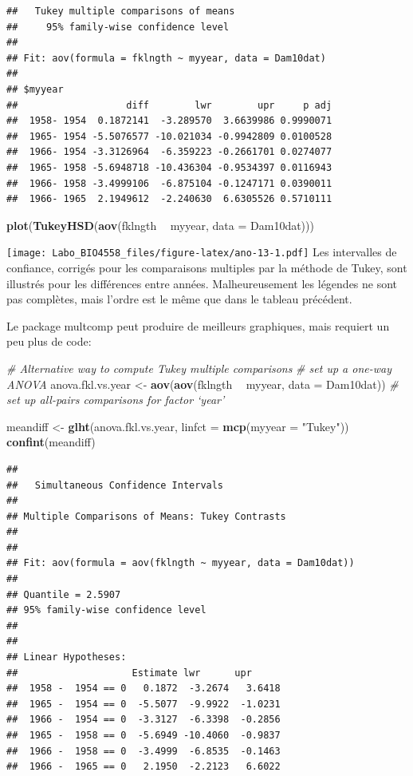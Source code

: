 \documentclass[12pt,]{book}
\newenvironment{Shaded}{\begin{snugshade}}{\end{snugshade}}
\newcommand{\CommentTok}[1]{\textcolor[rgb]{0.37,0.37,0.37}{\textit{#1}}}
\newcommand{\DataTypeTok}[1]{\textcolor[rgb]{0.27,0.27,0.27}{#1}}
\newcommand{\KeywordTok}[1]{\textcolor[rgb]{0.27,0.27,0.27}{\textbf{#1}}}
\newcommand{\NormalTok}[1]{#1}
\newcommand{\OperatorTok}[1]{\textcolor[rgb]{0.43,0.43,0.43}{\textbf{#1}}}
\newcommand{\StringTok}[1]{\textcolor[rgb]{0.5,0.5,0.5}{#1}}
\begin{document}
\begin{verbatim}
##   Tukey multiple comparisons of means
##     95% family-wise confidence level
## 
## Fit: aov(formula = fklngth ~ myyear, data = Dam10dat)
## 
## $myyear
##                   diff        lwr        upr     p adj
##  1958- 1954  0.1872141  -3.289570  3.6639986 0.9990071
##  1965- 1954 -5.5076577 -10.021034 -0.9942809 0.0100528
##  1966- 1954 -3.3126964  -6.359223 -0.2661701 0.0274077
##  1965- 1958 -5.6948718 -10.436304 -0.9534397 0.0116943
##  1966- 1958 -3.4999106  -6.875104 -0.1247171 0.0390011
##  1966- 1965  2.1949612  -2.240630  6.6305526 0.5710111
\end{verbatim}

\begin{Shaded}
\begin{Highlighting}[]
\KeywordTok{plot}\NormalTok{(}\KeywordTok{TukeyHSD}\NormalTok{(}\KeywordTok{aov}\NormalTok{(fklngth }\OperatorTok{~}\StringTok{ }\NormalTok{myyear, }\DataTypeTok{data =}\NormalTok{ Dam10dat)))}
\end{Highlighting}
\end{Shaded}

\texttt{[image: Labo\_BIO4558\_files/figure-latex/ano-13-1.pdf]}
Les intervalles de confiance, corrigés pour les comparaisons multiples par la méthode de Tukey, sont illustrés pour les différences entre années. Malheureusement les légendes ne sont pas complètes, mais l'ordre est le même que dans le tableau précédent.

Le package multcomp peut produire de meilleurs graphiques, mais requiert un peu plus de code:

\begin{Shaded}
\begin{Highlighting}[]
\CommentTok{# Alternative way to compute Tukey multiple comparisons}
\CommentTok{# set up a one-way ANOVA}
\NormalTok{anova.fkl.vs.year <-}\StringTok{ }\KeywordTok{aov}\NormalTok{(}\KeywordTok{aov}\NormalTok{(fklngth }\OperatorTok{~}\StringTok{ }\NormalTok{myyear, }\DataTypeTok{data =}\NormalTok{ Dam10dat))}
\CommentTok{# set up all-pairs comparisons for factor `year'}

\NormalTok{meandiff <-}\StringTok{ }\KeywordTok{glht}\NormalTok{(anova.fkl.vs.year, }\DataTypeTok{linfct =} \KeywordTok{mcp}\NormalTok{(}\DataTypeTok{myyear =}
\StringTok{"Tukey"}\NormalTok{))}
\KeywordTok{confint}\NormalTok{(meandiff)}
\end{Highlighting}
\end{Shaded}

\begin{verbatim}
## 
## 	 Simultaneous Confidence Intervals
## 
## Multiple Comparisons of Means: Tukey Contrasts
## 
## 
## Fit: aov(formula = aov(fklngth ~ myyear, data = Dam10dat))
## 
## Quantile = 2.5907
## 95% family-wise confidence level
##  
## 
## Linear Hypotheses:
##                    Estimate lwr      upr     
##  1958 -  1954 == 0   0.1872  -3.2674   3.6418
##  1965 -  1954 == 0  -5.5077  -9.9922  -1.0231
##  1966 -  1954 == 0  -3.3127  -6.3398  -0.2856
##  1965 -  1958 == 0  -5.6949 -10.4060  -0.9837
##  1966 -  1958 == 0  -3.4999  -6.8535  -0.1463
##  1966 -  1965 == 0   2.1950  -2.2123   6.6022
\end{verbatim}
\end{document}
